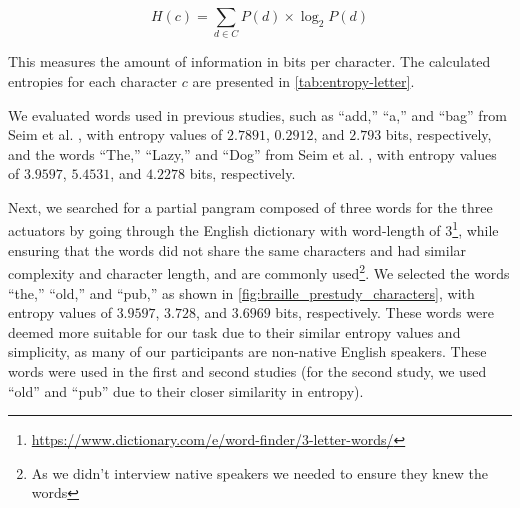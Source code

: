 \[
H(c) = \sum_{d \in C} P(d) \times \log_2 P(d)
\]

This measures the amount of information in bits per character. The calculated entropies for each character \( c \) are presented in \autoref{tab:entropy-letter}.

\begin{table}
    \centering
    \caption{Entropy for each Braille letter rounded to $4$ decimal places.}
    \label{tab:entropy-letter}
\end{table}

We evaluated words used in previous studies, such as ``add,'' ``a,'' and ``bag'' from Seim et al. \cite{Seim2014a, Seim2014}, with entropy values of \( 2.7891 \), \( 0.2912 \), and \( 2.793 \) bits, respectively, and the words ``The,'' ``Lazy,'' and ``Dog''  from Seim et al. \cite{Seim2018}, with entropy values of \( 3.9597 \), \( 5.4531 \), and \( 4.2278 \) bits, respectively.

Next, we searched for a partial pangram composed of three words for the three actuators by going through the English dictionary with word-length of  3\footnote{\url{https://www.dictionary.com/e/word-finder/3-letter-words/}}, while ensuring that the words did not share the same characters and had similar complexity and character length, and are commonly used\footnote{As we didn't interview native speakers we needed to ensure they knew the words}. 
We selected the words ``the,'' ``old,'' and ``pub,'' as shown in \autoref{fig:braille_prestudy_characters}, with entropy values of \( 3.9597 \), \( 3.728 \), and \( 3.6969 \) bits, respectively. These words were deemed more suitable for our task due to their similar entropy values and simplicity, as many of our participants are non-native English speakers. These words were used in the first and second studies (for the second study, we used ``old'' and ``pub'' due to their closer similarity in entropy).

